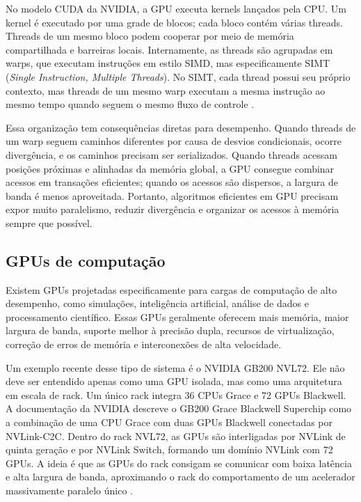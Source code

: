 No modelo CUDA da NVIDIA, a GPU executa kernels lançados pela CPU. Um kernel é
executado por uma grade de blocos; cada bloco contém várias threads. Threads de
um mesmo bloco podem cooperar por meio de memória compartilhada e barreiras
locais. Internamente, as threads são agrupadas em warps, que executam instruções
em estilo SIMD, mas especificamente SIMT (\textit{Single Instruction, Multiple Threads}). 
No SIMT, cada thread possui seu próprio contexto, mas threads de um mesmo warp executam a mesma
instrução ao mesmo tempo quando seguem o mesmo fluxo de controle
\cite{cudaguide}.

Essa organização tem consequências diretas para desempenho. Quando threads de um
warp seguem caminhos diferentes por causa de desvios condicionais, ocorre
divergência, e os caminhos precisam ser serializados. Quando threads acessam
posições próximas e alinhadas da memória global, a GPU consegue combinar acessos
em transações eficientes; quando os acessos são dispersos, a largura de banda é
menos aproveitada. Portanto, algoritmos eficientes em GPU precisam expor muito
paralelismo, reduzir divergência e organizar os acessos à memória sempre que
possível.

\subsection{GPUs de computação}
Existem GPUs projetadas especificamente para cargas de computação de alto desempenho, como
simulações, inteligência artificial, análise de dados e processamento científico. Essas GPUs 
geralmente oferecem mais memória, maior
largura de banda, suporte melhor à precisão dupla, recursos de virtualização,
correção de erros de memória e interconexões de alta velocidade.

Um exemplo recente desse tipo de sistema é o NVIDIA GB200 NVL72. Ele não deve ser
entendido apenas como uma GPU isolada, mas como uma arquitetura em escala de rack.
Um único rack integra 36 CPUs Grace e 72 GPUs Blackwell. A documentação da
NVIDIA descreve o GB200 Grace Blackwell Superchip como a combinação de uma CPU
Grace com duas GPUs Blackwell conectadas por NVLink-C2C.
Dentro do rack NVL72, as GPUs são interligadas por NVLink de
quinta geração e por NVLink Switch, formando um domínio NVLink com 72 GPUs. A
ideia é que as GPUs do rack consigam se comunicar com baixa latência e alta
largura de banda, aproximando o rack do comportamento de um acelerador
massivamente paralelo único \cite{nvidiagb200nvl72}.

